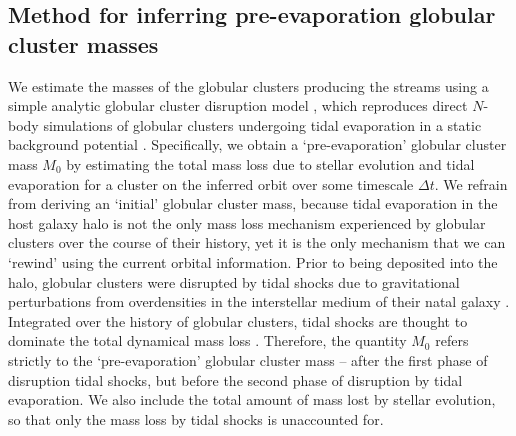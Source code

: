 \documentclass[twocolumn]{aastex63}
\begin{document}
\subsection{Method for inferring pre-evaporation globular cluster masses}
We estimate the masses of the globular clusters producing the streams using a simple analytic globular cluster disruption model \citep{lamers05}, which reproduces direct $N$-body simulations of globular clusters undergoing tidal evaporation in a static background potential \citep{baumgardt03}. Specifically, we obtain a `pre-evaporation' globular cluster mass $M_0$ by estimating the total mass loss due to stellar evolution and tidal evaporation for a cluster on the inferred orbit over some timescale $\Delta t$. We refrain from deriving an `initial' globular cluster mass, because tidal evaporation in the host galaxy halo is not the only mass loss mechanism experienced by globular clusters over the course of their history, yet it is the only mechanism that we can `rewind' using the current orbital information. Prior to being deposited into the halo, globular clusters were disrupted by tidal shocks due to gravitational perturbations from overdensities in the interstellar medium of their natal galaxy \citep[e.g.][]{gieles06,elmegreen:2010b,kruijssen11,miholics17,pfeffer:2018}. Integrated over the history of globular clusters, tidal shocks are thought to dominate the total dynamical mass loss \citep[e.g.][]{kruijssen15b}. Therefore, the quantity $M_0$ refers strictly to the `pre-evaporation' globular cluster mass -- after the first phase of disruption tidal shocks, but before the second phase of disruption by tidal evaporation. We also include the total amount of mass lost by stellar evolution, so that only the mass loss by tidal shocks is unaccounted for.
\end{document}
